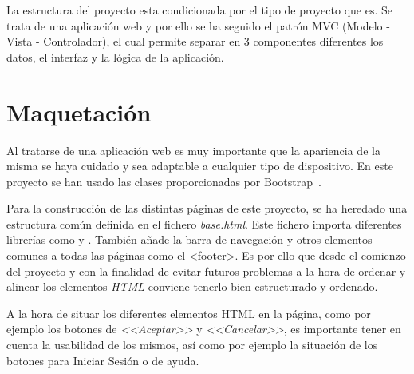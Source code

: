 La estructura del proyecto esta condicionada por el tipo de proyecto que es. Se trata de una aplicación web y por ello se ha seguido el patrón MVC (Modelo - Vista - Controlador), el cual permite separar en 3 componentes diferentes los datos, el interfaz y la lógica de la aplicación. 

\section{Maquetación}
Al tratarse de una aplicación web es muy importante que la apariencia de la misma se haya cuidado y sea adaptable a cualquier tipo de dispositivo. En este proyecto se han usado las clases proporcionadas por Bootstrap~\cite{doc:bootstrap}.


Para la construcción de las distintas páginas de este proyecto, se ha heredado una estructura común definida en el fichero \textit{base.html}. Este fichero importa diferentes librerías como  y . También añade la barra de navegación y otros elementos comunes a todas las páginas como el <footer>. Es por ello que desde el comienzo del proyecto y con la finalidad de evitar futuros problemas a la hora de ordenar y alinear los elementos \textit{HTML} conviene tenerlo bien estructurado y ordenado. 


A la hora de situar los diferentes elementos HTML en la página, como por ejemplo los botones de \textit{<<Aceptar>>} y \textit{<<Cancelar>>}, es importante tener en cuenta la usabilidad de los mismos, así como por ejemplo la situación de los botones para Iniciar Sesión o de ayuda.

